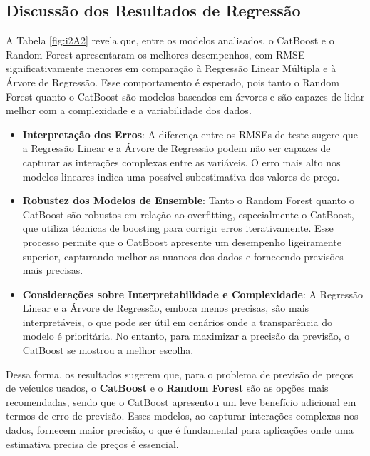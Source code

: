 \documentclass[a4paper,12pt]{article}[abntex2]
\begin{document}
\subsection*{\textbf{Discussão dos Resultados de Regressão}}


A Tabela \ref{fig:i2A2} revela que, entre os modelos analisados, o CatBoost e o Random Forest apresentaram os melhores desempenhos, com RMSE significativamente menores em comparação à Regressão Linear Múltipla e à Árvore de Regressão. Esse comportamento é esperado, pois tanto o Random Forest quanto o CatBoost são modelos baseados em árvores e são capazes de lidar melhor com a complexidade e a variabilidade dos dados.

\begin{itemize}
    \item \textbf{Interpretação dos Erros}: A diferença entre os RMSEs de teste sugere que a Regressão Linear e a Árvore de Regressão podem não ser capazes de capturar as interações complexas entre as variáveis. O erro mais alto nos modelos lineares indica uma possível subestimativa dos valores de preço.
    \item \textbf{Robustez dos Modelos de Ensemble}: Tanto o Random Forest quanto o CatBoost são robustos em relação ao overfitting, especialmente o CatBoost, que utiliza técnicas de boosting para corrigir erros iterativamente. Esse processo permite que o CatBoost apresente um desempenho ligeiramente superior, capturando melhor as nuances dos dados e fornecendo previsões mais precisas.
    \item \textbf{Considerações sobre Interpretabilidade e Complexidade}: A Regressão Linear e a Árvore de Regressão, embora menos precisas, são mais interpretáveis, o que pode ser útil em cenários onde a transparência do modelo é prioritária. No entanto, para maximizar a precisão da previsão, o CatBoost se mostrou a melhor escolha.
\end{itemize}

Dessa forma, os resultados sugerem que, para o problema de previsão de preços de veículos usados, o \textbf{CatBoost} e o \textbf{Random Forest} são as opções mais recomendadas, sendo que o CatBoost apresentou um leve benefício adicional em termos de erro de previsão. Esses modelos, ao capturar interações complexas nos dados, fornecem maior precisão, o que é fundamental para aplicações onde uma estimativa precisa de preços é essencial.
\end{document}
